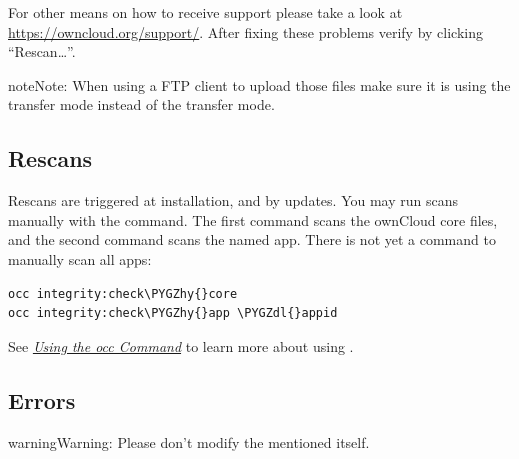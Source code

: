 \documentclass[letterpaper,10pt,english]{sphinxmanual}
\def\PYGZdl{\char`\$}
\def\PYGZhy{\char`\-}
\begin{document}
For other means on how to receive support please take a look at
\href{https://owncloud.org/support/}{https://owncloud.org/support/}. After fixing these problems verify by clicking
``Rescan…''.

\begin{notice}{note}{Note:}
When using a FTP client to upload those files make sure it is using the
 transfer mode instead of the  transfer mode.
\end{notice}


\subsection{Rescans}
\label{issues/code_signing:rescans}\label{issues/code_signing:rescans-label}
Rescans are triggered at installation, and by updates. You may run scans manually with the  command. The first command scans the ownCloud core files, and the second command scans the named app. There is not yet a command to manually scan all apps:

\begin{Verbatim}[commandchars=\\\{\}]
occ integrity:check\PYGZhy{}core
occ integrity:check\PYGZhy{}app \PYGZdl{}appid
\end{Verbatim}

See {\hyperref[configuration_server/occ_command::doc]{\emph{Using the occ Command}}} to learn more about using .


\subsection{Errors}
\label{issues/code_signing:errors}
\begin{notice}{warning}{Warning:}
Please don't modify the mentioned  itself.
\end{notice}
\end{document}
